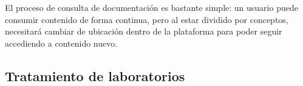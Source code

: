             El proceso de consulta de documentación es bastante simple: un usuario puede consumir contenido de forma continua, pero al estar dividido por conceptos, necesitará cambiar de ubicación dentro de la plataforma para poder seguir accediendo a contenido nuevo.
            
            \newpage
            
        \subsection{Tratamiento de laboratorios}
        
            \begin{figure}[h]
                \centering
                
                \begin{subfigure}{0.45\textwidth}
                    \centering

\end{subfigure}
\end{figure}

